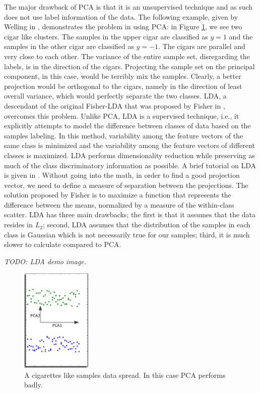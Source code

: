 \iftoggle{edit-mode}{\hspace{0pt}\marginpar{LDA}}{}
The major drawback of PCA is that it is an unsupervised technique and as such does not use label information of the data. The following example, given by Welling in \cite{welling2005fisher}, demonstrates the problem in using PCA: in Figure \ref{fig:cigarettes_data}, we see two cigar like clusters. The samples in the upper cigar are classified as $y=1$ and the samples in the other cigar are classified as $y=-1$. The cigars are parallel and very close to each other. The variance of the entire sample set, disregarding the labels, is in the direction of the cigars. Projecting the sample set on the principal component, in this case, would be terribly mix the samples. Clearly, a better projection would be orthogonal to the cigars, namely in the direction of least overall variance, which would perfectly separate the two classes.
LDA, a descendant of the original Fisher-LDA that was proposed by Fisher in \cite{fisher1936use}, overcomes this problem. Unlike PCA, LDA is a supervised technique, i.e., it explicitly attempts to model the difference between classes of data based on the samples labeling. In this method, variability among the feature vectors of the same class is minimized and the variability among the feature vectors of different classes is maximized. LDA performs dimensionality reduction while preserving as much of the class discriminatory information as possible. A brief tutorial on LDA is given in \cite{balakrishnama1998linear}. Without going into the math, in order to find a good projection vector, we need to define a measure of separation between the projections. The solution proposed by Fisher is to maximize a function that represents the difference between the means, normalized by a measure of the within-class scatter. LDA has three main drawbacks; the first is that it assumes that the data resides in $L_2$; second, LDA assumes that the distribution of the samples in each class is Gaussian which is not necessarily true for our samples; third, it is much slower to calculate compared to PCA.

\emph{TODO: LDA demo image.}\\

\begin{figure}
\centering
\includegraphics[width=0.3\textwidth]{./figures/cigarettes_data}       
\caption{A cigarettes like samples data spread. In this case PCA performs badly.}
\label{fig:cigarettes_data}
\end{figure}

